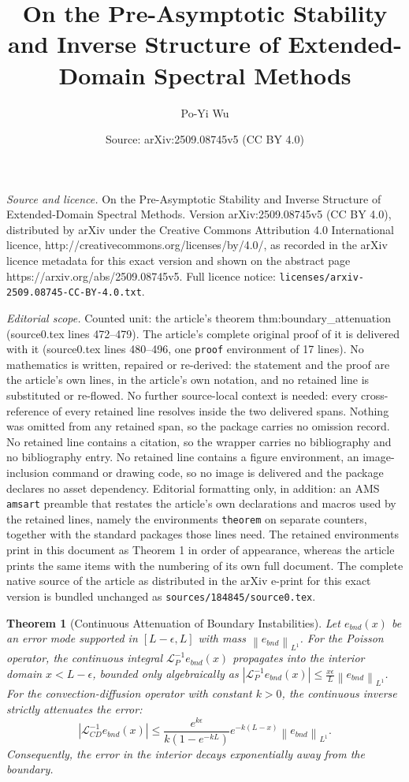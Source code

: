 \documentclass[10pt,a4paper]{amsart}
\title{On the Pre-Asymptotic Stability and Inverse Structure of Extended-Domain Spectral Methods}
\author{Po-Yi Wu}
\date{Source: arXiv:2509.08745v5 (CC BY 4.0)}
\newtheorem{theorem}{Theorem}
\newcommand{\norm}[1]{\left\lVert#1\right\rVert}
\begin{document}
\maketitle

\noindent\emph{Source and licence.} On the Pre-Asymptotic Stability and Inverse Structure of Extended-Domain Spectral Methods. Version arXiv:2509.08745v5 (CC BY 4.0), distributed by arXiv under the Creative Commons Attribution 4.0 International licence, http://creativecommons.org/licenses/by/4.0/, as recorded in the arXiv licence metadata for this exact version and shown on the abstract page https://arxiv.org/abs/2509.08745v5. Full licence notice: \texttt{licenses/arxiv-2509.08745-CC-BY-4.0.txt}.\par\smallskip

\noindent\textit{Editorial scope.} Counted unit: the article's theorem thm:boundary\_attenuation (source0.tex lines 472--479). The article's complete original proof of it is delivered with it (source0.tex lines 480--496, one \texttt{proof} environment of 17 lines). No mathematics is written, repaired or re-derived: the statement and the proof are the article's own lines, in the article's own notation, and no retained line is substituted or re-flowed.  No further source-local context is needed: every cross-reference of every retained line resolves inside the two delivered spans.  Nothing was omitted from any retained span, so the package carries no omission record.  No retained line contains a citation, so the wrapper carries no bibliography and no bibliography entry.  No retained line contains a figure environment, an image-inclusion command or drawing code, so no image is delivered and the package declares no asset dependency.  Editorial formatting only, in addition: an AMS \texttt{amsart} preamble that restates the article's own declarations and macros used by the retained lines, namely the environments \texttt{theorem} on separate counters, together with the standard packages those lines need.  The retained environments print in this document as Theorem 1 in order of appearance, whereas the article prints the same items with the numbering of its own full document.  The complete native source of the article as distributed in the arXiv e-print for this exact version is bundled unchanged as \texttt{sources/184845/source0.tex}.
\begin{theorem}[Continuous Attenuation of Boundary Instabilities]
\label{thm:boundary_attenuation}
Let $e_{bnd}(x)$ be an error mode supported in $[L-\epsilon, L]$ with mass $\norm{e_{bnd}}_{L^1}$. 
For the Poisson operator, the continuous integral $\mathcal{L}_P^{-1} e_{bnd}(x)$ propagates into the interior domain $x < L-\epsilon$, bounded only algebraically as $|\mathcal{L}_P^{-1} e_{bnd}(x)| \le \frac{x\epsilon}{L} \norm{e_{bnd}}_{L^1}$.
For the convection-diffusion operator with constant $k > 0$, the continuous inverse strictly attenuates the error:
\begin{equation} |\mathcal{L}_{CD}^{-1} e_{bnd}(x)| \le \frac{e^{k\epsilon}}{k(1-e^{-kL})} e^{-k(L-x)} \norm{e_{bnd}}_{L^1}. \end{equation}
Consequently, the error in the interior decays exponentially away from the boundary.
\end{theorem}
\end{document}
